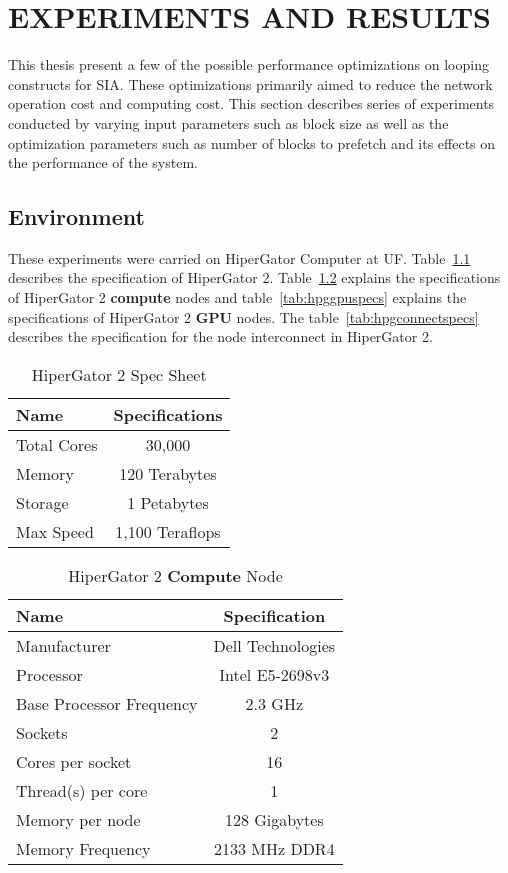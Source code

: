 \chapter{EXPERIMENTS AND RESULTS}\label{results}

This thesis present a few of the possible performance optimizations on looping
constructs for SIA. These optimizations primarily aimed to reduce the network
operation cost and computing cost. This section describes series of experiments
conducted by varying input parameters such as block size as well as the optimization
parameters such as number of blocks to prefetch and its effects on the performance
of the system.

\section{Environment}
These experiments were carried on HiperGator Computer at UF. Table~\ref{tab:hpg2spec}
describes the specification of HiperGator 2. Table~\ref{tab:hpgcomputespecs}
explains the specifications of HiperGator 2 \textbf{compute} nodes and
table~\ref{tab:hpggpuspecs} explains the specifications of HiperGator 2 \textbf{GPU}
nodes. The table~\ref{tab:hpgconnectspecs} describes the specification for the
node interconnect in HiperGator 2.

\begin{table}[h]
  \centering
  \begin{tabular}{l | c}
    \hline
    Name        & Specifications  \\
    \hline
    Total Cores & 30,000          \\
    Memory      & 120 Terabytes   \\
    Storage     & 1 Petabytes     \\
    Max Speed   & 1,100 Teraflops \\
    \hline
  \end{tabular}
  \caption{HiperGator 2 Spec Sheet}
  \label{tab:hpg2spec}
\end{table}

\begin{table}[h]
  \centering
  \begin{tabular}{l | c}
    \hline
    Name                       & Specification     \\
    \hline
    Manufacturer               & Dell Technologies \\
    Processor                  & Intel E5-2698v3   \\
    Base Processor Frequency   & 2.3 GHz           \\
    Sockets                    & 2                 \\
    Cores per socket           & 16                \\
    Thread(s) per core         & 1                 \\
    Memory per node            & 128 Gigabytes     \\
    Memory Frequency           & 2133 MHz DDR4     \\
    \hline
  \end{tabular}
  \caption{HiperGator 2 \textbf{Compute} Node}
  \label{tab:hpgcomputespecs}
\end{table}

